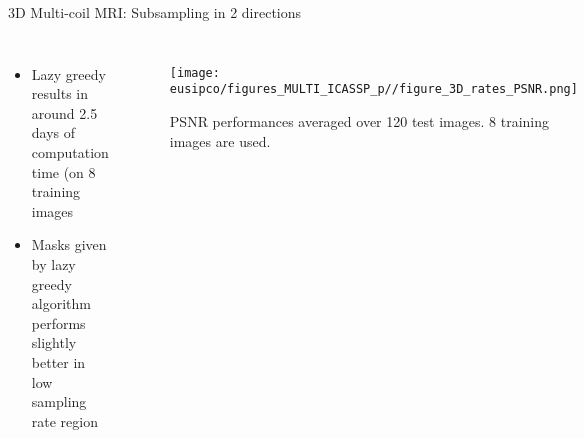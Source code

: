 \begin{frame}{3D Multi-coil MRI: Subsampling in 2 directions}

\begin{columns}
\begin{itemize}
\item Lazy greedy results in around 2.5 days of computation time (on 8 training images
\item Masks given by lazy greedy algorithm performs slightly better in low sampling rate region \\[2mm]
\end{itemize}
\begin{figure}%
  \centering
 \texttt{[image: eusipco/figures\_MULTI\_ICASSP\_p//figure\_3D\_rates\_PSNR.png]} \\
\caption{ PSNR  performances averaged over 120 test images. 8 training images are used. }
\label{fig:figure_3D_rates}
\vspace{-5mm}
\end{figure}
\end{columns}
\end{frame}




